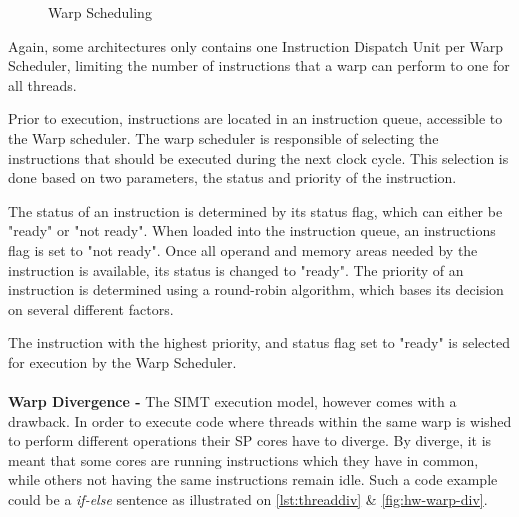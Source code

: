 \begin{figure}[ht]
	\centering
	\caption{Warp Scheduling}
	\label{fig:hw-warp-scheduling}
\end{figure}

Again, some architectures only contains one Instruction Dispatch Unit per Warp Scheduler, limiting the number of instructions that a warp can perform to one for all threads.

Prior to execution, instructions are located in an instruction queue, accessible to the Warp scheduler.
The warp scheduler is responsible of selecting the instructions that should be executed during the next clock cycle.
This selection is done based on two parameters, the status and priority of the instruction.

The status of an instruction is determined by its status flag, which can either be "ready" or "not ready".
When loaded into the instruction queue, an instructions flag is set to "not ready".
Once all operand and memory areas needed by the instruction is available, its status is changed to "ready".
The priority of an instruction is determined using a round-robin algorithm, which bases its decision on several different factors.

The instruction with the highest priority, and status flag set to "ready" is selected for execution by the Warp Scheduler.
\\\\
\textbf{Warp Divergence -} The SIMT execution model, however comes with a drawback.
In order to execute code where threads within the same warp is wished to perform different operations their SP cores have to diverge.
By diverge, it is meant that some cores are running instructions which they have in common, while others not having the same instructions remain idle.
Such a code example could be a \textit{if-else} sentence as illustrated on
\autoref{lst:threaddiv} \& \cref{fig:hw-warp-div}.


